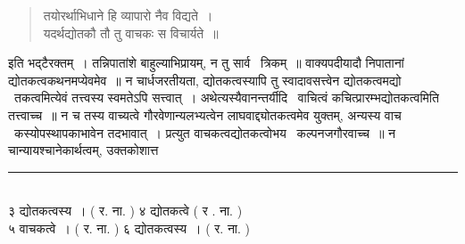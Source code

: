\documentclass[11pt, openany]{book}
\begin{document}
\begin{multicols}{2}
\begin{quote}
{तयोरर्थाभिधाने हि व्यापारो नैव विद्यते~।\\
यदर्थद्योतकौ तौ तु वाचकः स विचार्यते~॥}
\end{quote}

इति भद्टैरक्तम्~। तन्निपातांशे बाहुल्याभिप्रायम्, न तु सार्व \textendash\ त्रिकम्~॥ वाक्यपदीयादौ निपातानां द्योतकत्वकथनमप्येवमेव~॥ न चार्धजरतीयता, द्योतकत्वस्यापि तु स्वादावसत्त्वेन द्योतकत्वमद्यो \textendash\ तकत्वमित्येवं तत्त्वस्य स्वमतेऽपि सत्त्वात्~। अथेत्यस्यैवानन्तर्यीदि \textendash\ वाचित्वं कचित्प्रारम्भद्योतकत्वमिति तत्त्वाच्च~॥ न च तस्य वाच्यत्वे गौरवेणान्यलभ्यत्वेन लाघवाद्द्योतकत्वमेव युक्तम्, अन्यस्य वाच \textendash\ कस्योपस्थापकाभावेन तदभावात्~। प्रत्युत वाचकत्वद्योतकत्वोभय \textendash\ कल्पनजगौरवाच्च~॥ न चान्यायश्चानेकार्थत्वम्, उक्तकोशात्त \textendash\

\noindent
\rule{1\linewidth}{0.5pt}\\

३ द्योतकत्वस्य~। ( र. ना. ) ४ द्योतकत्वे ( र . ना. ) \\

५ वाचकत्वे~। ( र. ना. ) ६ द्योतकत्वस्य~। ( र. ना. ) 
\end{multicols}

\newpage

\end{document}
